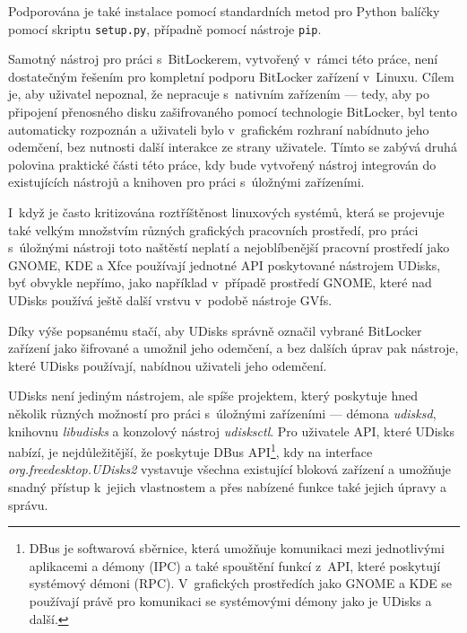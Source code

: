 Podporována je také instalace pomocí standardních metod pro Python balíčky pomocí skriptu \texttt{setup.py}, případně pomocí nástroje \texttt{pip}.

\label{sec:integrace}

Samotný nástroj pro práci s~BitLockerem, vytvořený v~rámci této práce, není dos\-ta\-teč\-ným řešením pro kompletní podporu BitLocker zařízení v~Linuxu. Cílem je, aby uživatel nepoznal, že nepracuje s~nativním zařízením --- tedy, aby po připojení přenosného disku zašifrovaného pomocí technologie BitLocker, byl tento automaticky rozpoznán a uživateli bylo v~grafickém rozhraní nabídnuto jeho odemčení, bez nutnosti další interakce ze strany uživatele. Tímto se zabývá druhá polovina praktické části této práce, kdy bude vytvořený nástroj integrován do existujících nástrojů a knihoven pro práci s~úložnými zařízeními.

\label{sec:udisks}

I~když je často kritizována roztříštěnost linuxových systémů, která se projevuje také velkým množstvím různých grafických pracovních prostředí, pro práci s~úložnými ná\-stro\-ji toto naštěstí neplatí a nejoblíbenější pracovní prostředí jako GNOME, KDE a Xfce používají jednotné API poskytované nástrojem UDisks, byť obvykle nepřímo, jako například v~případě prostředí GNOME, které nad UDisks používá ještě další vrstvu v~podobě nástroje GVfs\cite{GVfs2019}.

Díky výše popsanému stačí, aby UDisks správně označil vybrané BitLocker zařízení jako šifrované a umožnil jeho odemčení, a bez dalších úprav pak nástroje, které UDisks používají, nabídnou uživateli jeho odemčení.

UDisks není jediným nástrojem, ale spíše projektem, který poskytuje hned několik různých možností pro práci s~úložnými zařízeními --- démona \emph{udisksd}, knihovnu \emph{libudisks} a konzolový nástroj \emph{udisksctl}\cite{UDisks2018}. Pro uživatele API, které UDisks nabízí, je nejdůležitější, že poskytuje DBus API\footnote{DBus je softwarová sběrnice, která umožňuje komunikaci mezi jednotlivými aplikacemi a démony (IPC) a také spouštění funkcí z~API, které poskytují systémový démoni (RPC). V~grafických prostředích jako GNOME a KDE se používají právě pro komunikaci se systémovými démony jako je UDisks a další.\cite{Palmieri2005}}, kdy na interface \emph{org.freedesktop.UDisks2} vystavuje všechna existující bloková zařízení a umožňuje snadný přístup k~jejich vlastnostem a přes nabízené funkce také jejich úpravy a správu.

